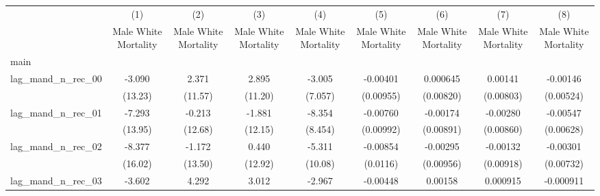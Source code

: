 {
\def\sym#1{\ifmmode^{#1}\else\(^{#1}\)\fi}
\begin{longtable}{l*{8}{c}}
\hline\hline\endfirsthead\hline\endhead\hline\endfoot\endlastfoot
                    &\multicolumn{1}{c}{(1)}&\multicolumn{1}{c}{(2)}&\multicolumn{1}{c}{(3)}&\multicolumn{1}{c}{(4)}&\multicolumn{1}{c}{(5)}&\multicolumn{1}{c}{(6)}&\multicolumn{1}{c}{(7)}&\multicolumn{1}{c}{(8)}\\
                    &\multicolumn{1}{c}{Male White Mortality}&\multicolumn{1}{c}{Male White Mortality}&\multicolumn{1}{c}{Male White Mortality}&\multicolumn{1}{c}{Male White Mortality}&\multicolumn{1}{c}{Male White Mortality}&\multicolumn{1}{c}{Male White Mortality}&\multicolumn{1}{c}{Male White Mortality}&\multicolumn{1}{c}{Male White Mortality}\\
\hline
main                &                     &                     &                     &                     &                     &                     &                     &                     \\
lag\_mand\_n\_rec\_00   &      -3.090         &       2.371         &       2.895         &      -3.005         &    -0.00401         &    0.000645         &     0.00141         &    -0.00146         \\
                    &     (13.23)         &     (11.57)         &     (11.20)         &     (7.057)         &   (0.00955)         &   (0.00820)         &   (0.00803)         &   (0.00524)         \\
[1em]
lag\_mand\_n\_rec\_01   &      -7.293         &      -0.213         &      -1.881         &      -8.354         &    -0.00760         &    -0.00174         &    -0.00280         &    -0.00547         \\
                    &     (13.95)         &     (12.68)         &     (12.15)         &     (8.454)         &   (0.00992)         &   (0.00891)         &   (0.00860)         &   (0.00628)         \\
[1em]
lag\_mand\_n\_rec\_02   &      -8.377         &      -1.172         &       0.440         &      -5.311         &    -0.00854         &    -0.00295         &    -0.00132         &    -0.00301         \\
                    &     (16.02)         &     (13.50)         &     (12.92)         &     (10.08)         &    (0.0116)         &   (0.00956)         &   (0.00918)         &   (0.00732)         \\
[1em]
lag\_mand\_n\_rec\_03   &      -3.602         &       4.292         &       3.012         &      -2.967         &    -0.00448         &     0.00158         &    0.000915         &   -0.000911         \\

\end{longtable}}
